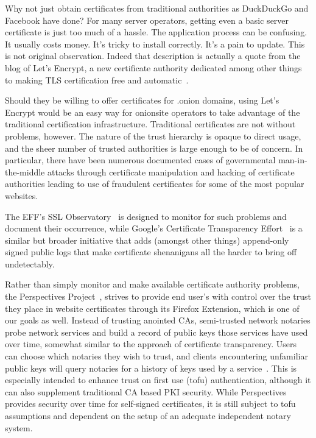\documentclass[10pt, conference, compsocconf]{styles/IEEEtran}
\begin{document}
Why not just obtain certificates from traditional authorities as
DuckDuckGo and Facebook have done? For many server operators, getting
even a basic server certificate is just too much of a hassle. The
application process can be confusing. It usually costs money. It's
tricky to install correctly. It's a pain to update. This is not 
original observation. Indeed that description is actually a quote
from the blog of
Let's Encrypt, a new certificate authority dedicated among other
things to making TLS certification free and automatic~\cite{lets-encrypt}.

Should they be willing to offer certificates for .onion domains, using
Let's Encrypt would be an easy way for onionsite operators to take
advantage of the traditional certification infrastructure. Traditional
certificates are not without problems, however. The nature of the
trust hierarchy is opaque to direct usage, and the sheer number of
trusted authorities is large enough to be of concern. In particular,
there have been numerous documented cases of governmental
man-in-the-middle attacks through certificate manipulation and hacking
of certificate authorities leading to use of fraudulent certificates
for some of the most popular websites. 

The EFF's SSL Observatory~\cite{ssl-observatory} is designed to
monitor for such problems and document their occurrence, while
Google's Certificate Transparency
Effort~\cite{certificate-transparency} is a similar but broader
initiative that adds (amongst other things) append-only signed public
logs that make certificate shenanigans all the harder to bring off
undetectably.

Rather than simply monitor and make available certificate authority
problems, the Perspectives Project~\cite{perspectives}, strives to
provide end user's with control over the trust they place in website
certificates through its Firefox Extension, which is one of our goals
as well. Instead of trusting
anointed CAs, semi-trusted network notaries probe network services and
build a record of public keys those services have used over time,
somewhat similar to the approach of certificate transparency. Users
can choose which notaries they wish to trust, and clients encountering
unfamiliar public keys will query notaries for a history of keys used
by a service~\cite{perspectives-paper}. This is especially intended to
enhance trust on first use (tofu) authentication, although it can also
supplement traditional CA based PKI security. While Perspectives
provides security over time for self-signed certificates, it is still
subject to tofu assumptions and dependent on the setup of an adequate
independent notary system.
\end{document}
